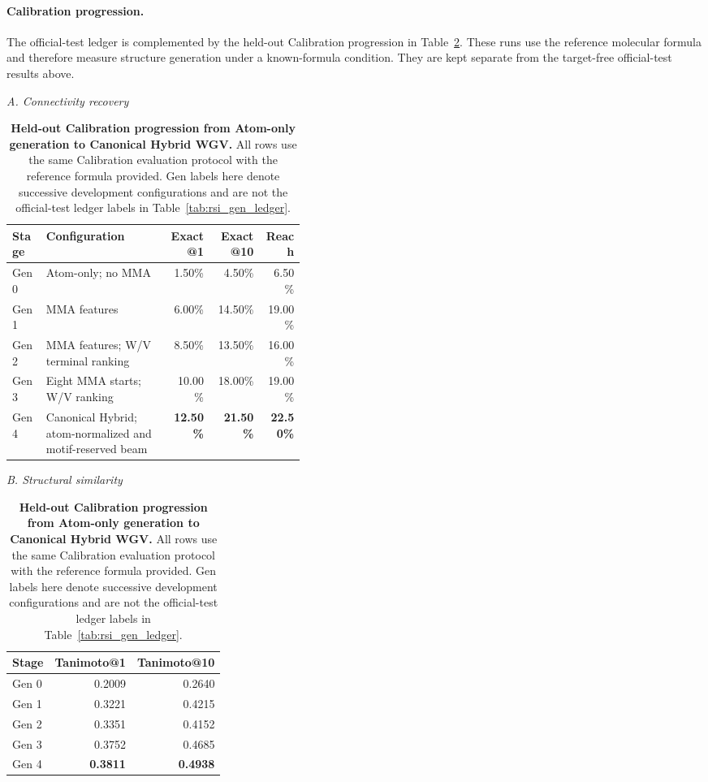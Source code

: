 \paragraph{Calibration progression.}
The official-test ledger is complemented by the held-out Calibration progression
in Table~\ref{tab:calibration_progression}. These runs use the reference molecular
formula and therefore measure structure generation under a known-formula condition.
They are kept separate from the target-free official-test results above.

\begin{table}[!htbp]
\centering
\caption{\textbf{Held-out Calibration progression from Atom-only generation to Canonical Hybrid WGV.}
All rows use the same Calibration evaluation protocol with the reference formula
provided. Gen labels here denote successive development configurations and are
not the official-test ledger labels in Table~\ref{tab:rsi_gen_ledger}.}
\label{tab:calibration_progression}
\small
\setlength{\tabcolsep}{3.5pt}
\renewcommand{\arraystretch}{1.10}
\noindent\textit{A. Connectivity recovery}\par\vspace{3pt}
\begin{tabular}{@{}lp{0.42\linewidth}rrr@{}}
\toprule
Stage & Configuration & Exact@1 & Exact@10 & Reach \\
\midrule
Gen 0 & Atom-only; no MMA & 1.50\% & 4.50\% & 6.50\% \\
Gen 1 & MMA features & 6.00\% & 14.50\% & 19.00\% \\
Gen 2 & MMA features; W/V terminal ranking & 8.50\% & 13.50\% & 16.00\% \\
Gen 3 & Eight MMA starts; W/V ranking & 10.00\% & 18.00\% & 19.00\% \\
Gen 4 & Canonical Hybrid; atom-normalized and motif-reserved beam & \textbf{12.50\%} & \textbf{21.50\%} & \textbf{22.50\%} \\
\bottomrule
\end{tabular}
\par\vspace{8pt}
\noindent\textit{B. Structural similarity}\par\vspace{3pt}
\begin{tabular}{@{}lrr@{}}
\toprule
Stage & Tanimoto@1 & Tanimoto@10 \\
\midrule
Gen 0 & 0.2009 & 0.2640 \\
Gen 1 & 0.3221 & 0.4215 \\
Gen 2 & 0.3351 & 0.4152 \\
Gen 3 & 0.3752 & 0.4685 \\
Gen 4 & \textbf{0.3811} & \textbf{0.4938} \\
\bottomrule
\end{tabular}
\end{table}

